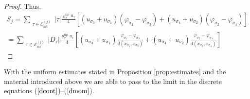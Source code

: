 \documentclass{amsart}
\numberwithin{equation}{section}
\begin{document}
\begin{proof}
Thus, 
\begin{align*}
    S_{j}  = \sum_{\substack{{\tau} \in {{\mathcal E}_{\mathrm{int}}^{(j)}}}} |{\tau} | \frac{ {\varrho}^{up}_{\tau} u_{\tau}}{4} \left[  \left(   {u_{{{\sigma}}_3}+u_{{{\sigma}}_1}}\right) (\varphi_{{{\sigma}}_1} - \varphi_{{{\sigma}}_3}) +  \left(   {u_{{{\sigma}}_4}+u_{{{\sigma}}_2}}\right) (\varphi_{{{\sigma}}_2} - \varphi_{{{\sigma}}_4})\right]
    \\
    = \sum_{\substack{{\tau} \in {{\mathcal E}_{\mathrm{int}}^{(j)}}}} |D_{\tau} | \frac{ {\varrho}^{up}_{\tau} u_{\tau}}{4} \left[  \left(   {u_{{{\sigma}}_3}+u_{{{\sigma}}_1}}\right) \frac {\varphi_{{{\sigma}}_1} - \varphi_{{{\sigma}}_3}}{d(x_{{{\sigma}}_1},x_{{{\sigma}}_3})} +  \left(   {u_{{{\sigma}}_4}+u_{{{\sigma}}_2}}\right) \frac {\varphi_{{{\sigma}}_2} - \varphi_{{{\sigma}}_4}}{d(x_{{{\sigma}}_2},x_{{{\sigma}}_4})}    \right]
\end{align*}
\end{proof}

With the uniform estimates stated in Proposition \ref{prop:estimates} and the material introduced above we are able to pass to the limit in the discrete equations ($\ref{dcont}$)--($\ref{dmom}$). 
\end{document}
